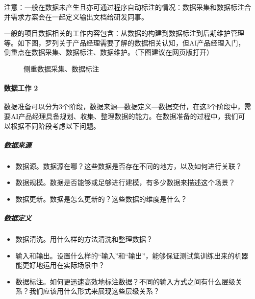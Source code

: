 \documentclass[letterpaper,11pt,english]{sphinxmanual}
\begin{document}
注意：一般在数据未产生且亦可通过程序自动标注的情况：数据采集和数据标注合并需求方案会在一起定义输出文档给研发同事。%
\begin{footnote}[729]\sphinxAtStartFootnote
{}
%
\end{footnote}

一般的项目数据相关的工作内容包含：从数据的构建到数据标注到后期维护管理等。如下图，罗列关于产品经理需要了解的数据相关认知，但AI产品经理入门，侧重点在数据采集、数据标注、数据维护。（下图建议在网页版打开）

\begin{figure}[H]
\centering
\capstart

\noindent{}
\caption{侧重数据采集、数据标注}\label{\detokenize{chapter_project/Data Process:id9}}\end{figure}


\paragraph{数据工作 2\sphinxfootnotemark[730]}
\label{\detokenize{chapter_project/Data Process:id2}}%
\begin{footnotetext}[730]\sphinxAtStartFootnote
{}
%
\end{footnotetext}\ignorespaces 
数据准备可以分为3个阶段，数据来源—数据定义—数据交付，在这3个阶段中，需要AI产品经理具备规划、收集、整理数据的能力。在数据准备的过程中，我们可以根据不同阶段考虑以下问题。


\subparagraph{数据来源}
\label{\detokenize{chapter_project/Data Process:id3}}\begin{itemize}
\item {} 
数据源。数据源在哪？这些数据是否存在不同的地方，以及如何进行关联？

\item {} 
数据规模。数据是否能够或足够进行建模，有多少数据来描述这个场景？

\item {} 
数据更新。数据是怎么更新的？这些数据的维度是什么？

\end{itemize}


\subparagraph{数据定义}
\label{\detokenize{chapter_project/Data Process:id4}}\begin{itemize}
\item {} 
数据清洗。用什么样的方法清洗和整理数据？

\item {} 
输入和输出。设置什么样的“输入”和“输出”，能够保证测试集训练出来的机器能更好地运用在实际场景中？

\item {} 
数据标注。如何更迅速高效地标注数据？不同的输入方式之间有什么层级关系？我们应该用什么形式来展现这些层级关系？

\end{itemize}
\end{document}
